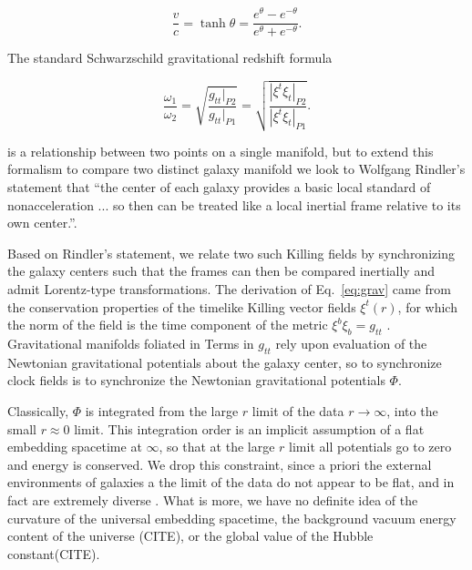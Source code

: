 \documentclass[reprint,%
 amsmath,amssymb,
 aps,
]{revtex4-1}
\begin{document}
     \begin{equation}
         \frac{v}{c} = \tanh \theta = \frac{e^\theta - e^{-\theta}}{e^\theta + e^{-\theta}} .   
         \label{boost}
     \end{equation} 

 
 
  
The standard Schwarzschild gravitational redshift formula

 \begin{equation}
       \frac{\omega_1}{\omega_2}  =\sqrt{\frac{g_{tt}|_{P2}}{g_{tt}|_{P1}}} =\sqrt{\frac{|\xi^t\xi_{t}|_{P2}}{|\xi^t\xi_{t}|_{P1}}}. 
      \label{eq:grav}
    \end{equation} 

is a relationship between two points on a single manifold, but  to extend this formalism to compare two distinct galaxy manifold  we look   to   Wolfgang Rindler's  statement that    ``the center of each galaxy provides a basic local standard of nonacceleration ... so then can be treated like a local inertial frame relative to its own center.''\cite{rindler2013essential}.

 
  Based on   Rindler's statement, 
  we relate two such Killing fields  by    synchronizing  the galaxy centers such that the  frames can then be compared inertially and admit  Lorentz-type transformations. 
  The derivation of Eq.~\ref{eq:grav} came from the conservation properties of  the timelike  Killing vector fields  
   $\xi^t(r)$, for which the norm of the field is the time  component of the metric $\xi^b \xi_b =g_{tt}$ \cite{Wald}. 
 Gravitational manifolds foliated in
 Terms in  $g_{tt}$ rely upon evaluation of the Newtonian  gravitational potentials about the galaxy center, so to
 synchronize   clock fields    is to synchronize 
   the Newtonian  gravitational potentials  $\Phi $. 
   
   
 Classically, $\Phi$ is integrated from the large $r$ limit of the data  $r \to \infty$,  into the   small $r\approx 0$ limit. 
This integration order is an implicit assumption of a flat embedding spacetime at $\infty$, so that at the large $r$ limit  all potentials go to zero and energy is conserved. We drop this constraint, since a priori the external environments of galaxies a the limit of the data do not appear to be    flat, 
and in fact are    extremely   diverse \cite{Pomarede:2020pme,Hoffman:2017ako}. What is more,  we have no definite idea of the curvature of the universal embedding spacetime, the background vacuum energy content of the universe (CITE), or the  global   value of the Hubble constant(CITE).  
\end{document}
